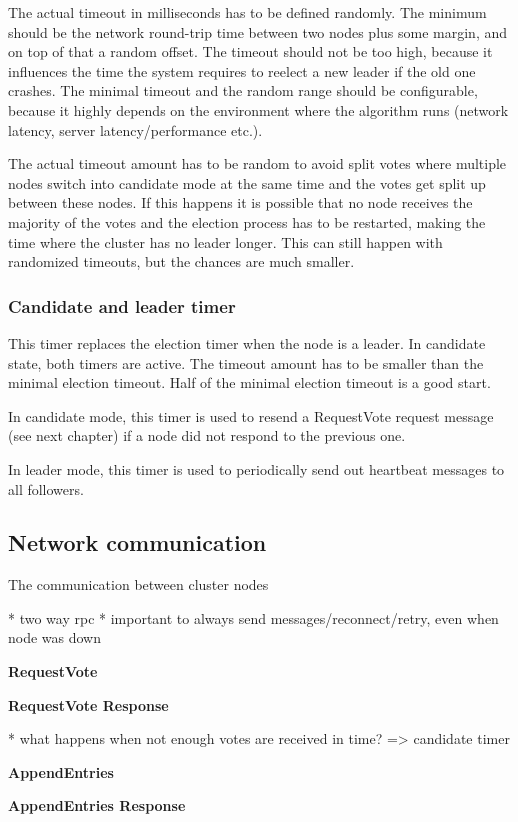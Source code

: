 The actual timeout in milliseconds has to be defined randomly. The minimum should be the network round-trip time between two nodes plus some margin,
and on top of that a random offset. The timeout should not be too high, because it influences the time the system requires to reelect a new leader
if the old one crashes. The minimal timeout and the random range should be configurable, because it highly depends on the environment where the algorithm runs
(network latency, server latency/performance etc.).

The actual timeout amount has to be random to avoid split votes where multiple nodes switch into candidate mode at the same time and the votes get split
up between these nodes. If this happens it is possible that no node receives the majority of the votes and the election process has to be restarted,
making the time where the cluster has no leader longer. This can still happen with randomized timeouts, but the chances are much smaller.

\subsubsection*{Candidate and leader timer}
This timer replaces the election timer when the node is a leader. In candidate state, both timers are active.
The timeout amount has to be smaller than the minimal election timeout. Half of the minimal election timeout is a good start.

In candidate mode, this timer is used to resend a RequestVote request message (see next chapter) if a node did not respond to the previous one.

In leader mode, this timer is used to periodically send out heartbeat messages to all followers.

\subsection{Network communication}

The communication between cluster nodes 

* two way rpc
* important to always send messages/reconnect/retry, even when node was down

\textbf{RequestVote}

\textbf{RequestVote Response}

* what happens when not enough votes are received in time? => candidate timer

\textbf{AppendEntries}

\textbf{AppendEntries Response}


